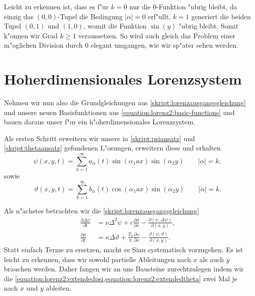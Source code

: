 \begin{refsection}
Leicht zu erkennen ist, dass es f"ur $k = 0$ nur die $0$-Funktion 
"ubrig bleibt, da einzig das $(0, 0)$-Tupel die Bedingung $|\alpha| = 0$ 
erf"ullt. $k = 1$ generiert die beiden Tupel $(0, 1)$ und $(1, 0)$, womit die 
Funktion $\sin(y)$ "ubrig bleibt. Somit k"onnen wir Grad $k \geq 1$ 
veraussetzen. So wird auch gleich das Problem einer m"oglichen Division durch 
$0$ elegant umgangen, wie wir sp"ater sehen werden.

\section{Hoherdimensionales Lorenzsystem\label{section:lorenz2:ho-model}}
Nehmen wir nun also die Grundgleichungen aus 
\cref{skript:lorenzausgangsgleichung} und unsere neuen Basisfunktionen aus 
\cref{equation:lorenz2:basic-functions} und bauen daraus unser f"ur ein 
h"oherdimensionales Lorenzsystem.

Als ersten Schritt erweitern wir unsere in \cref{skript:psiansatz} und 
\cref{skript:thetaansatz} gefundenen L"osungen, erweitern diese und erhalten
\begin{equation}
\psi(x,y,t) =
\sum_{k = 1}^{\infty}
a_{\alpha}(t)
\sin(\alpha_1 ax) \sin(\alpha_2 y)
\qquad |\alpha| = k,
\label{equation:lorenz2:extendedpsi}
\end{equation}
sowie
\begin{equation}
\vartheta(x,y,t) =
\sum_{k = 1}^{\infty}
b_{\alpha}(t)
\cos(\alpha_1 ax) \sin(\alpha_2 y)
\qquad |\alpha| = k.
\label{equation:lorenz2:extendedtheta}
\end{equation}

Als n"achstes betrachten wir die \cref{skript:lorenzausgangsgleichung}
\begin{align*}
\frac{\partial\Delta\psi}{\partial t}
&=
\nu\Delta^2\psi 
+c\frac{\partial\vartheta}{\partial x}
-\frac{\partial(\psi,\Delta\psi)}{\partial(x,y)},
\\
\frac{\partial\vartheta}{\partial t}
&=
\kappa\Delta\vartheta
+ \frac{T_0}{\pi}\frac{\partial\psi}{\partial x}
- \frac{\partial(\psi,\vartheta)}{\partial(x,y)}.
\end{align*}
Statt einfach Terme zu ersetzen, macht es Sinn systematisch vorzugehen. Es ist 
leicht zu erkennen, dass wir sowohl partielle Ableitungen nach $x$ als auch $y$ 
brauchen werden. Daher fangen wir an uns Bausteine zurechtzulegen indem wir die 
\cref{equation:lorenz2:extendedpsi,equation:lorenz2:extendedtheta} 
zwei Mal je nach $x$ und $y$ ableiten.


\end{refsection}
